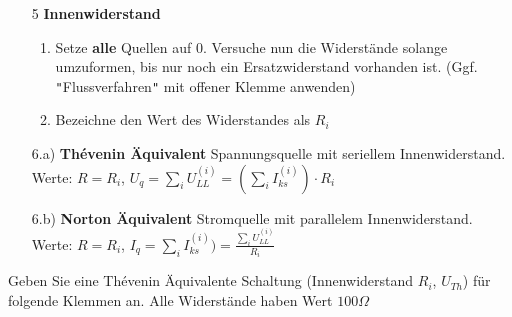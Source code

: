 																				  \iend
																				\begin{itemize}

																				  \item[5] \textbf{Innenwiderstand}
																				  \begin{enumerate}
																				    \item Setze \textbf{alle} Quellen auf 0. Versuche nun die Widerstände solange umzuformen, bis nur noch ein Ersatzwiderstand vorhanden ist. (Ggf. \texttt{"}Flussverfahren\texttt{"} mit offener Klemme anwenden)
																				    \item Bezeichne den Wert des Widerstandes als $R_i$
																				  \end{enumerate}
																				  \item[6.a)] \textbf{Thévenin Äquivalent} Spannungsquelle mit seriellem Innenwiderstand. \\
																				  Werte: $\displaystyle   R= R_i$, $U_q = \sum_i U_{LL}^{(i)} = (\sum_i I_{ks}^{(i)})\cdot R_i$

																				  \item[6.b)] \textbf{Norton Äquivalent} Stromquelle mit parallelem Innenwiderstand. \\
																				  Werte: $\displaystyle  R= R_i$, $I_q = \sum_i I_{ks}^{(i)}) = \frac{\sum_i U_{LL}^{(i)}}{R_i}$

																				  \end{itemize}

																				\iend





																				\newpage
																				\beginbsp
																				Geben Sie eine Thévenin Äquivalente Schaltung (Innenwiderstand $R_i$, $U_{Th}$) für folgende Klemmen an. Alle Widerstände haben Wert $100\Omega$ \\

